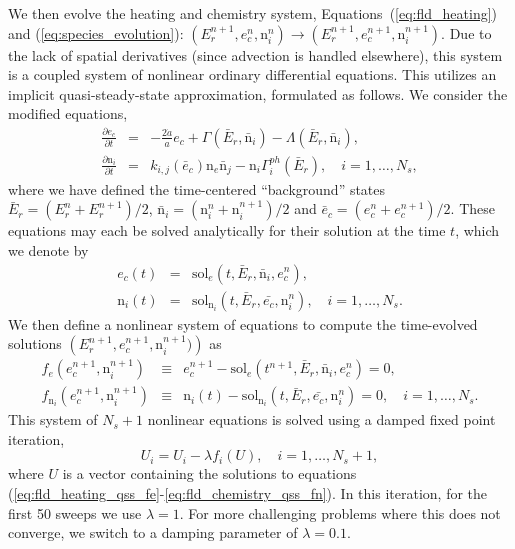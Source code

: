 We then evolve the heating and chemistry system, Equations~(\ref{eq:fld_heating})
and (\ref{eq:species_evolution}):  
$(E_r^{n+1}, e_c^n, {\mathrm n}_i^n) \to (E_r^{n+1}, e_c^{n+1},
{\mathrm n}_i^{n+1})$.  Due to the lack of spatial derivatives (since
advection is handled elsewhere), this system is a coupled system of
nonlinear ordinary differential equations.  This utilizes an implicit
quasi-steady-state approximation, formulated as follows.  We consider
the modified equations,
\begin{eqnarray}
  \label{eq:fld_heating_qss}
  \frac{\partial e_c}{\partial t} &=& -\frac{2\dot{a}}{a} e_c +
    \Gamma\left(\bar{E}_r,\bar{\mathrm n}_i\right) - 
    \Lambda\left(\bar{E}_r,\bar{\mathrm n}_i\right), \\
  \label{eq:fld_chemistry_qss}
  \frac{\partial {\mathrm n}_i}{\partial t} &=& k_{i,j}\left(\bar{e}_c\right)
    {\mathrm n}_e \bar{\mathrm n}_j - {\mathrm n}_i 
    \Gamma_i^{ph}\left(\bar{E}_r\right), \quad i=1,\ldots,N_s,
\end{eqnarray}
where we have defined the time-centered ``background'' states
$\bar{E}_r = \left(E_r^{n}+E_r^{n+1}\right)/2$, 
$\bar{\mathrm n}_i = \left({\mathrm n}_i^{n}+{\mathrm n}_i^{n+1}\right)/2$
and $\bar{e}_c = \left(e_c^{n}+e_c^{n+1}\right)/2$.  These equations
may each be solved analytically for their solution at the time
$t$, which we denote by
\begin{eqnarray}
  \label{eq:fld_heating_qss_sol}
  e_c(t) &=& \text{sol}_{e}\left(t,\bar{E}_r,\bar{\mathrm n}_i,e_c^n\right), \\
  \label{eq:fld_chemistry_qss_sol}
  {\mathrm n}_i(t) &=& \text{sol}_{\mathrm n_i}
  \left(t,\bar{E}_r,\bar{e_c},\mathrm n_i^n\right), \quad i=1,\ldots,N_s. 
\end{eqnarray}
We then define a nonlinear system of equations to compute the
time-evolved solutions $\left(E_r^{n+1}, e_c^{n+1}, 
{\mathrm n}_i^{n+1})\right)$ as
\begin{eqnarray}
  \label{eq:fld_heating_qss_fe}
  f_e(e_c^{n+1},{\mathrm n}_i^{n+1}) &\equiv& e_c^{n+1} -
    \text{sol}_{e}\left(t^{n+1},\bar{E}_r,\bar{\mathrm n}_i,e_c^n\right)
    = 0, \\
  \label{eq:fld_chemistry_qss_fn}
  f_{\mathrm n_i}(e_c^{n+1},{\mathrm n}_i^{n+1}) &\equiv& 
    {\mathrm n}_i(t) - \text{sol}_{\mathrm n_i}
    \left(t,\bar{E}_r,\bar{e_c},\mathrm n_i^n\right)=0, \quad
    i=1,\ldots,N_s.  
\end{eqnarray}
This system of $N_s+1$ nonlinear equations is solved using a damped
fixed point iteration, 
\[
   U_i = U_i - \lambda f_i(U), \quad i=1,\ldots,N_s+1,
\]
where $U$ is a vector containing the solutions to equations
(\ref{eq:fld_heating_qss_fe}-\ref{eq:fld_chemistry_qss_fn}).  In this
iteration, for the first 50 sweeps we use $\lambda=1$. For more 
challenging problems where this does not converge, we switch to a damping
parameter of $\lambda=0.1$.
